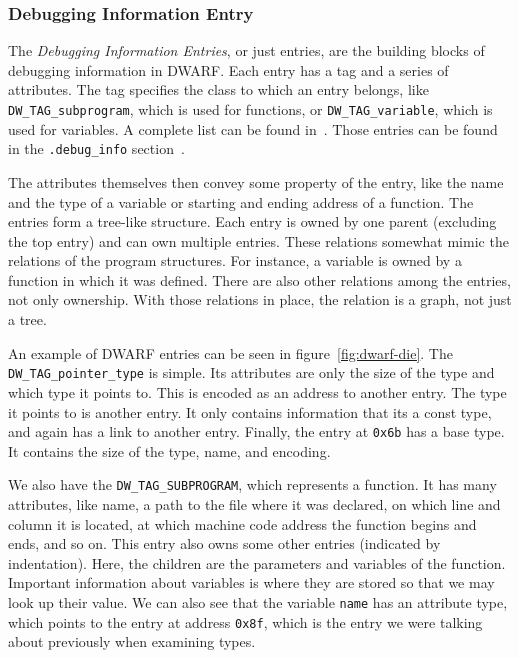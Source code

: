\subsubsection{Debugging Information Entry}
The \textit{Debugging Information Entries}, or just entries, are the building
blocks of debugging information in DWARF. Each entry has a tag and a series of
attributes. The tag specifies the class to which an entry belongs, like
\verb|DW_TAG_subprogram|, which is used for functions, or
\verb|DW_TAG_variable|, which is used for variables. A complete list can be
found in~\cite{dwarf}. Those entries can be found in the \verb|.debug_info|
section~\cite{dwarf}. 

The attributes themselves then convey some property of the entry, like the name
and the type of a variable or starting and ending address of a function. The
entries form a tree-like structure. Each entry is owned by one parent
(excluding the top entry) and can own multiple entries. These relations
somewhat mimic the relations of the program structures. For instance, a
variable is owned by a function in which it was defined. There are also other
relations among the entries, not only ownership. With those relations in place,
the relation is a graph, not just a tree.

An example of DWARF entries can be seen in figure~\ref{fig:dwarf-die}. The
\verb|DW_TAG_pointer_type| is simple. Its attributes are only the size of the
type and which type it points to. This is encoded as an address to another
entry. The type it points to is another entry. It only contains information
that its a const type, and again has a link to another entry. Finally, the
entry at \texttt{0x6b} has a base type. It contains the size of the type, name,
and encoding. 

We also have the \verb|DW_TAG_SUBPROGRAM|, which represents a function. It has
many attributes, like name, a path to the file where it was declared, on which
line and column it is located, at which machine code address the function
begins and ends, and so on. This entry also owns some other entries (indicated
by indentation). Here, the children are the parameters and variables of the
function. Important information about variables is where they are stored so
that we may look up their value. We can also see that the variable
\texttt{name} has an attribute type, which points to the entry at address
\texttt{0x8f}, which is the entry we were talking about previously when
examining types.

